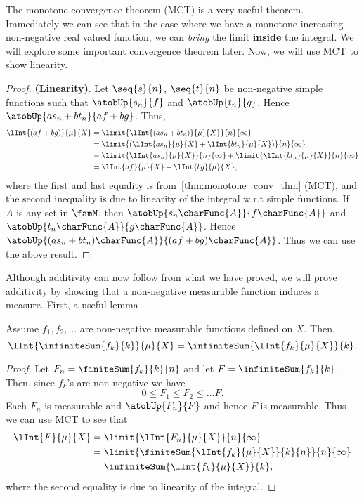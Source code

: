 The monotone convergence theorem (MCT) is a very useful theorem. Immediately we can see that in the case where
we have a monotone increasing non-negative real valued function, we can \emph{bring} the limit \textbf{inside}
the integral. We will explore some important convergence theorem later. Now, we will use MCT to show 
linearity.
\begin{proof}
    \textbf{(Linearity)}. Let $\seq{s}{n}$, $\seq{t}{n}$ be non-negative simple functions such that
    $\atobUp{s_n}{f}$ and $\atobUp{t_n}{g}$. Hence $\atobUp{as_n + bt_n}{af + bg}$. Thus,
    \begin{align*}
	\lInt{(af+bg)}{\mu}{X} &= \limit{\lInt{(as_n + bt_n)}{\mu}{X}}{n}{\infty}\\
	&= \limit{\left(\lInt{as_n}{\mu}{X} + \lInt{bt_n}{\mu}{X}\right)}{n}{\infty}\\
	&= \limit{\lInt{as_n}{\mu}{X}}{n}{\infty} + \limit{\lInt{bt_n}{\mu}{X}}{n}{\infty} \\
	&= \lInt{af}{\mu}{X} + \lInt{bg}{\mu}{X},
    \end{align*}
    where the first and last equality is from~\ref{thm:monotone_conv_thm} (MCT), and the second inequality is
    due to linearity of the integral w.r.t simple functions. If $A$ is any set in $\famM$, then
    $\atobUp{s_n\charFunc{A}}{f\charFunc{A}}$ and $\atobUp{t_n\charFunc{A}}{g\charFunc{A}}$. 
    Hence $\atobUp{(as_n + bt_n)\charFunc{A}}{(af + bg)\charFunc{A}}$. Thus we can use the above result.
\end{proof}
Although additivity can now follow from what we have proved, we will prove additivity by showing 
that a non-negative measurable function induces a measure. First, a useful
lemma
\begin{Lemma}\label{lemma:int_induces_meas}
    Assume $f_1,f_2,\ldots$ are non-negative measurable functions defined on $X$. Then,
    \[\lInt{\infiniteSum{f_k}{k}}{\mu}{X} = \infiniteSum{\lInt{f_k}{\mu}{X}}{k}.\]
\end{Lemma}
\begin{proof}
    Let $F_n = \finiteSum{f_k}{k}{n}$ and let $F = \infiniteSum{f_k}{k}$. Then, since $f_k$'s are non-negative
    we have
    \[0 \leq F_1 \leq F_2 \leq \ldots F.\]
    Each $F_n$ is measurable and $\atobUp{F_n}{F}$ and hence $F$ is measurable. Thus we can use MCT to see
    that
    \begin{align*}
	\lInt{F}{\mu}{X} &= \limit{\lInt{F_n}{\mu}{X}}{n}{\infty}\\
	&= \limit{\finiteSum{\lInt{f_k}{\mu}{X}}{k}{n}}{n}{\infty}\\
	&= \infiniteSum{\lInt{f_k}{\mu}{X}}{k},
    \end{align*}
    where the second equality is due to linearity of the integral.
\end{proof}
